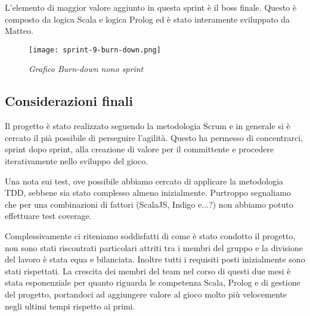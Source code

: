 L'elemento di maggior valore aggiunto in questa sprint è il boss finale. Questo è composto da logica Scala e logica Prolog ed è stato interamente sviluppato da Matteo. 

\begin{figure}[!hbt]
    \centering
    \texttt{[image: sprint-9-burn-down.png]}
    \caption{\textit{Grafico Burn-down nono sprint}} 
\end{figure}

\subsection{Considerazioni finali}

Il progetto è stato realizzato seguendo la metodologia Scrum e in generale si è cercato il pià possibile di perseguire l'agilità. 
Questo ha permesso di concentrarci, sprint dopo sprint, alla creazione di valore per il committente e procedere iterativamente nello sviluppo del gioco. 

Una nota sui test, ove possibile abbiamo cercato di applicare la metodologia TDD, sebbene sia stato complesso almeno inizialmente. Purtroppo segnaliamo che per una combinazioni di fattori (ScalaJS, Indigo e...?) non abbiamo potuto effettuare test coverage. 

Complessivamente ci riteniamo soddisfatti di come è stato condotto il progetto, non sono stati riscontrati particolari attriti tra i membri del gruppo e la divisione del lavoro è stata equa e bilanciata.
Inoltre tutti i requisiti posti inizialmente sono stati rispettati.
La crescita dei membri del team nel corso di questi due mesi è stata esponenziale per quanto riguarda le competenza Scala, Prolog e di gestione del progetto, portandoci ad aggiungere valore al gioco molto più velocemente negli ultimi tempi rispetto ai primi. 

